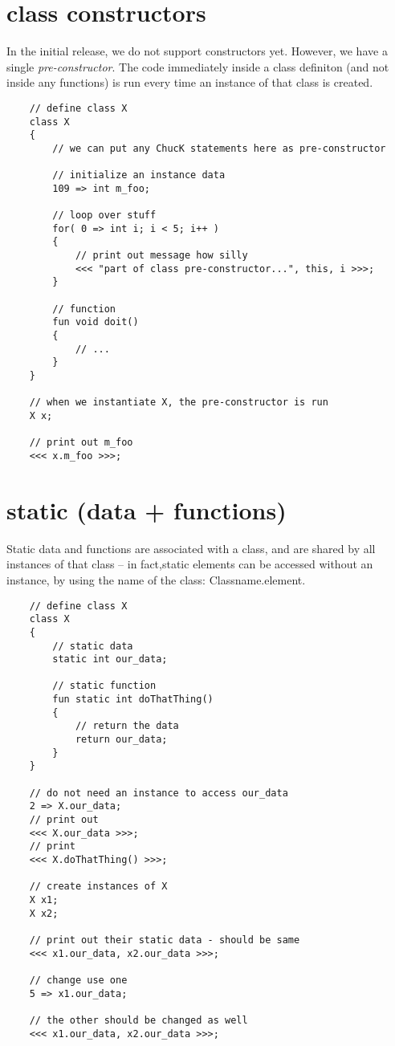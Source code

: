 \section{class constructors}

In the initial release, we do not support constructors yet. However, we have a single {\it pre-constructor}. The code immediately inside a class definiton (and not inside any functions) is run every time an instance of that class is created.

\begin{verbatim}
    // define class X
    class X
    {
        // we can put any ChucK statements here as pre-constructor

        // initialize an instance data
        109 => int m_foo;

        // loop over stuff
        for( 0 => int i; i < 5; i++ )
        {
            // print out message how silly
            <<< "part of class pre-constructor...", this, i >>>;
        }

        // function
        fun void doit()
        {
            // ...
        }
    }

    // when we instantiate X, the pre-constructor is run
    X x;

    // print out m_foo
    <<< x.m_foo >>>;
\end{verbatim}

\section{static (data + functions)}

Static data and functions are associated with a class, and are shared by all instances of that class -- in fact,static elements can be accessed without an instance, by using the name of the class: Classname.element.

\begin{verbatim}
    // define class X
    class X
    {
        // static data
        static int our_data;

        // static function
        fun static int doThatThing()
        {
            // return the data
            return our_data;
        }
    }

    // do not need an instance to access our_data
    2 => X.our_data;
    // print out
    <<< X.our_data >>>;
    // print
    <<< X.doThatThing() >>>;

    // create instances of X
    X x1;
    X x2;

    // print out their static data - should be same
    <<< x1.our_data, x2.our_data >>>;

    // change use one
    5 => x1.our_data;

    // the other should be changed as well
    <<< x1.our_data, x2.our_data >>>;
\end{verbatim}

